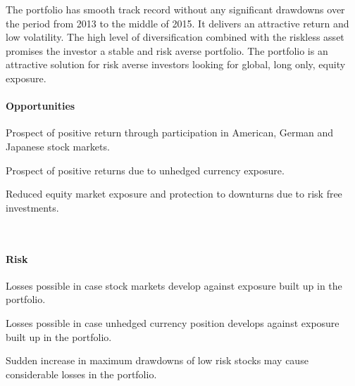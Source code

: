 \documentclass[11pt, parskip=full, DIV=14, headings=small, footsepline, footinclude=false, headsepline]{scrreprt}
\begin{document}
The portfolio has smooth track record without any significant drawdowns over the period from 2013 to the middle of 2015.
It delivers an attractive return and low volatility.
The high level of diversification combined with the riskless asset promises the investor a stable and risk averse portfolio.
The portfolio is an attractive solution for risk averse investors looking for global, long only, equity exposure.
 

\begin{minipage}[t]{0.49\textwidth}
  \paragraph{Opportunities}
  \begin{sit}
    \item Prospect of positive return through participation in American, German and Japanese stock markets.
    \item Prospect of positive returns due to unhedged currency exposure.
    \item Reduced equity market exposure and protection to downturns due to risk free investments.
  \end{sit}
\end{minipage}
~~
\begin{minipage}[t]{0.49\textwidth}
  \paragraph{Risk}
  \begin{sit}
    \item Losses possible in case stock markets develop against exposure built up in the portfolio.
    \item Losses possible in case unhedged currency position develops against exposure built up in the portfolio.
    \item Sudden increase in maximum drawdowns of low risk stocks may cause considerable losses in the portfolio.
  \end{sit}
\end{minipage}
\end{document}

